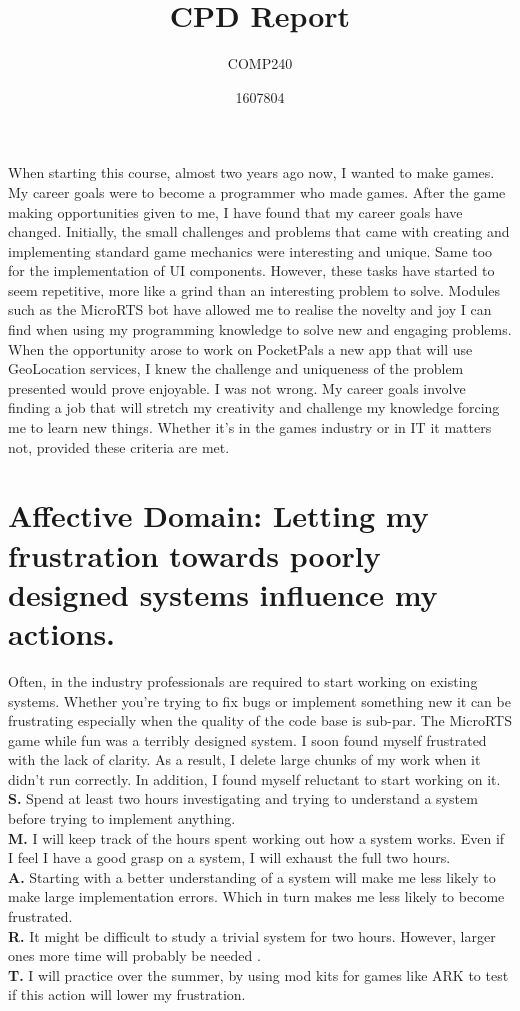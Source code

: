 \documentclass{scrartcl}
\title{CPD Report}
\subtitle{COMP240}
\author{1607804}
\begin{document}
\maketitle

\abstract{}
When starting this course, almost two years ago now, I wanted to make games. My career goals were to become a programmer who made games. After the game making opportunities given to me, I have found that my career goals have changed. Initially, the small challenges and problems that came with creating and implementing standard game mechanics were interesting and unique. Same too for the implementation of UI components. However, these tasks have started to seem repetitive, more like a grind than an interesting problem to solve. Modules such as the MicroRTS bot have allowed me to realise the novelty and joy I can find when using my programming knowledge to solve new and engaging problems. When the opportunity arose to work on PocketPals a new app that will use GeoLocation services, I knew the challenge and uniqueness of the problem presented would prove enjoyable. I was not wrong. My career goals involve finding a job that will stretch my creativity and challenge my knowledge forcing me to learn new things. Whether it's in the games industry or in IT it matters not, provided these criteria are met.

\section{Affective Domain: Letting my frustration towards poorly designed systems influence my actions.}
Often, in the industry professionals are required to start working on existing systems. Whether you're trying to fix bugs or implement something new it can be frustrating
especially when the quality of the code base is sub-par. The MicroRTS game while fun was a terribly designed system. I soon found myself frustrated with the lack of clarity.
As a result, I delete large chunks of my work when it didn't run correctly. In addition, I found myself reluctant to start working on it.\\
\textbf{S.}    Spend at least two hours investigating and trying to understand a system before trying to implement anything.\\
\textbf{M.}   I will keep track of the hours spent working out how a system works. Even if I feel I have a good grasp on a system, I will exhaust the full two hours.\\
\textbf{A.}   Starting with a better understanding of a system will make me less likely to make large implementation errors. Which in turn makes me less likely to become frustrated.\\
\textbf{R.}   It might be difficult to study a trivial system for two hours. However, larger ones more time will probably be needed .\\
\textbf{T.}   I will practice over the summer, by using mod kits for games like ARK to test if this action will lower my frustration.\\
\end{document}
